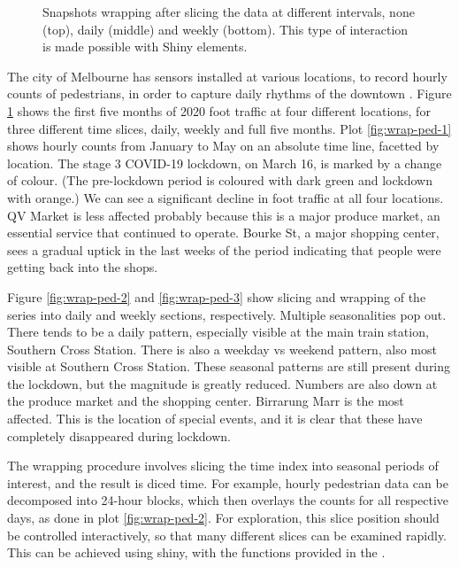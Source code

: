 \begin{Schunk}
\begin{figure}
{}

\caption[Snapshots wrapping after slicing the  data at different intervals, none (top), daily (middle) and weekly (bottom)]{Snapshots wrapping after slicing the  data at different intervals, none (top), daily (middle) and weekly (bottom). This type of interaction is made possible with Shiny elements.}\label{fig:wrap-ped}
\end{figure}
\end{Schunk}

The city of Melbourne has sensors installed at various locations, to
record hourly counts of pedestrians, in order to capture daily rhythms
of the downtown \citep{ped}. Figure \ref{fig:wrap-ped} shows the first
five months of 2020 foot traffic at four different locations, for three
different time slices, daily, weekly and full five months. Plot
\ref{fig:wrap-ped-1} shows hourly counts from January to May on an
absolute time line, facetted by location. The stage 3 COVID-19 lockdown,
on March 16, is marked by a change of colour. (The pre-lockdown period
is coloured with dark green and lockdown with orange.) We can see a
significant decline in foot traffic at all four locations. QV Market is
less affected probably because this is a major produce market, an
essential service that continued to operate. Bourke St, a major shopping
center, sees a gradual uptick in the last weeks of the period indicating
that people were getting back into the shops.

Figure \ref{fig:wrap-ped-2} and \ref{fig:wrap-ped-3} show slicing and
wrapping of the series into daily and weekly sections, respectively.
Multiple seasonalities pop out. There tends to be a daily pattern,
especially visible at the main train station, Southern Cross Station.
There is also a weekday vs weekend pattern, also most visible at
Southern Cross Station. These seasonal patterns are still present during
the lockdown, but the magnitude is greatly reduced. Numbers are also
down at the produce market and the shopping center. Birrarung Marr is
the most affected. This is the location of special events, and it is
clear that these have completely disappeared during lockdown.

The wrapping procedure involves slicing the time index into seasonal
periods of interest, and the result is diced time. For example, hourly
pedestrian data can be decomposed into 24-hour blocks, which then
overlays the counts for all respective days, as done in plot
\ref{fig:wrap-ped-2}. For exploration, this slice position should be
controlled interactively, so that many different slices can be examined
rapidly. This can be achieved using shiny, with the functions provided
in the .

